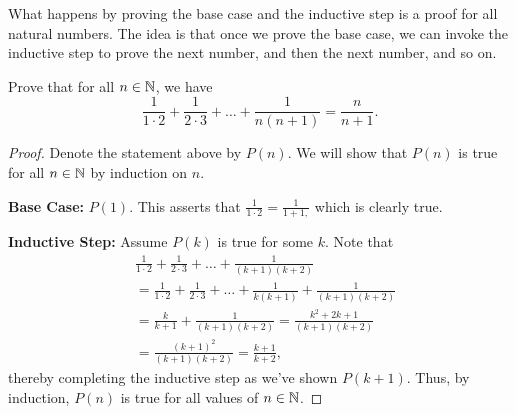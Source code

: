 \documentclass[main.tex]{subfiles}
\begin{document}
What happens by proving the base case and the inductive step is a proof for all natural numbers. The idea is that once we prove the base case, we can invoke the inductive step to prove the next number, and then the next number, and so on.

\begin{example}
    Prove that for all $n\in \mathbb N$, we have
    \[\frac{1}{1\cdot 2} + \frac{1}{2\cdot 3} + \ldots + \frac{1}{n(n + 1)} = \frac{n}{n + 1}.\]
\end{example}

\begin{proof}
    Denote the statement above by $P(n)$. We will show that $P(n)$ is true for all $n\in \mathbb N$ by induction on $n$.
    
    \textbf{Base Case:} $P(1)$. This asserts that $\frac{1}{1\cdot 2} = \frac{1}{1 + 1,}$ which is clearly true.
    
    \textbf{Inductive Step:} Assume $P(k)$ is true for some $k$. Note that
    \begin{align*}
        &\frac{1}{1\cdot 2} + \frac{1}{2\cdot 3} + \ldots + \frac{1}{(k + 1)(k + 2)} \\
        &=\frac{1}{1\cdot 2} + \frac{1}{2\cdot 3} + \ldots + \frac{1}{k(k + 1)} + \frac{1}{(k + 1)(k + 2)} \\
        &=\frac{k}{k + 1} + \frac{1}{(k + 1)(k + 2)} = \frac{k^2 + 2k + 1}{(k + 1)(k + 2)} \\
        &=\frac{(k + 1)^2}{(k + 1)(k + 2)} = \frac{k + 1}{k + 2},
    \end{align*}
    thereby completing the inductive step as we've shown $P(k + 1)$. Thus, by induction, $P(n)$ is true for all values of $n\in \mathbb N$.
\end{proof}
\end{document}
